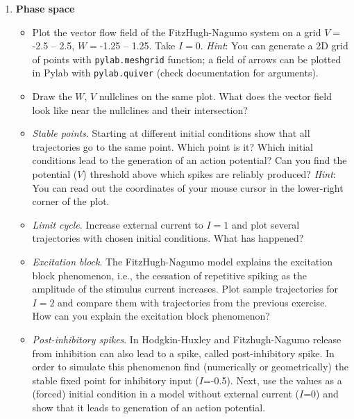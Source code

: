 \documentclass[12pt]{article}
\begin{document}
\begin{enumerate}
    \item \textbf{Phase space}
        \begin{itemize}
        \item Plot the vector flow field of the FitzHugh-Nagumo system on
            a grid $V=$-2.5 -- 2.5, $W=$-1.25 -- 1.25. Take $I=0$.
            \textit{Hint}: You can generate a 2D grid of points with
            \texttt{pylab.meshgrid} function; a field of arrows can be
            plotted in Pylab with \texttt{pylab.quiver} (check
            documentation for arguments).  
        \item Draw the $W$, $V$ nullclines on the same plot. What does
            the vector field look like near the nullclines and their
            intersection? 
        \item \textit{Stable points}. Starting at different initial
            conditions show that all trajectories go to the same
            point. Which point is it? Which initial conditions lead to
            the generation of an action potential? Can you find the
            potential ($V$) threshold above which spikes are reliably
            produced? \textit{Hint}: You can read out the coordinates
            of your mouse cursor in the lower-right corner of the plot.
        \item \textit{Limit cycle}. Increase external current to
                $I=1$ and plot several trajectories with chosen initial conditions. What has happened?
        \item \textit{Excitation block}. The FitzHugh-Nagumo model
            explains the excitation block phenomenon, i.e., the
            cessation of repetitive spiking as the amplitude of the
            stimulus current increases. Plot sample trajectories for
            $I=2$ and compare them with trajectories from the previous
            exercise. How can you explain the excitation block phenomenon?
        \item \textit{Post-inhibitory spikes}. In Hodgkin-Huxley and
            Fitzhugh-Nagumo release from inhibition can also lead to a
            spike, called post-inhibitory spike. In order to simulate
            this phenomenon find (numerically or geometrically) the
            stable fixed point for inhibitory input ($I$=-0.5). Next,
            use the values as a (forced) initial condition in a model
            without external current ($I$=0) and show that it leads to
            generation of an action potential.


\end{itemize}
\end{enumerate}
\end{document}
